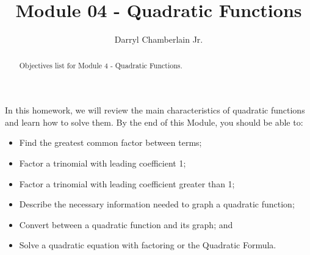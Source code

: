\documentclass{ximera}
\author{Darryl Chamberlain Jr.}
\title{Module 04 - Quadratic Functions}
\begin{document}
\begin{abstract}
Objectives list for Module 4 - Quadratic Functions.
\end{abstract}
\maketitle

In this homework, we will review the main characteristics of quadratic functions and learn how to solve them. By the end of this Module, you should be able to:

\begin{itemize}
	\item Find the greatest common factor between terms;
	\item Factor a trinomial with leading coefficient 1;
	\item Factor a trinomial with leading coefficient greater than 1;
	\item Describe the necessary information needed to graph a quadratic function;
	\item Convert between a quadratic function and its graph; and
	\item Solve a quadratic equation with factoring or the Quadratic Formula.
\end{itemize}
\end{document}
